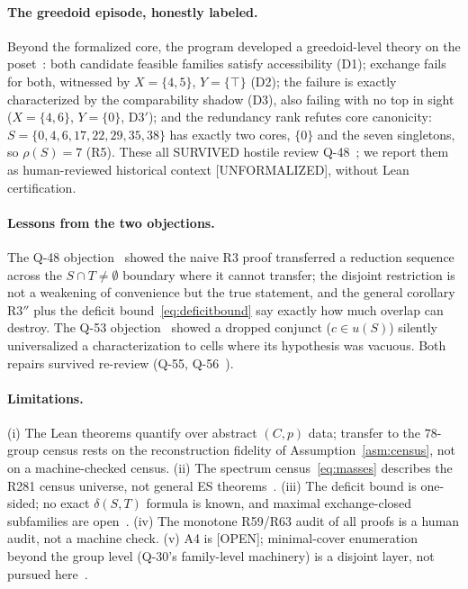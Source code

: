 \documentclass[11pt,a4paper]{article}
\theoremstyle{definition}
\begin{document}
\paragraph{The greedoid episode, honestly labeled.}  Beyond the formalized
core, the program developed a greedoid-level theory on the poset~\cite{D311}:
both candidate feasible families satisfy accessibility (D1); exchange fails
for both, witnessed by $X=\{4,5\}$, $Y=\{\top\}$ (D2); the failure is exactly
characterized by the comparability shadow (D3), also failing with no top in
sight ($X=\{4,6\}$, $Y=\{0\}$, D3$'$); and the redundancy rank refutes core
canonicity: $S=\{0,4,6,17,22,29,35,38\}$ has exactly two cores, $\{0\}$ and
the seven singletons, so $\rho(S)=7$ (R5).  These all SURVIVED hostile review
Q-48~\cite{D315}; we report them as human-reviewed historical context
[UNFORMALIZED], without Lean certification.

\paragraph{Lessons from the two objections.}  The Q-48 objection~\cite{D315}
showed the naive R3 proof transferred a reduction sequence across the
$S\cap T\ne\emptyset$ boundary where it cannot transfer; the disjoint
restriction is not a weakening of convenience but the true statement, and
the general corollary R3$''$ plus the deficit bound~\eqref{eq:deficitbound}
say exactly how much overlap can destroy.  The Q-53 objection~\cite{D316}
showed a dropped conjunct ($c\in u(S)$) silently universalized a
characterization to cells where its hypothesis was vacuous.  Both repairs
survived re-review (Q-55, Q-56~\cite{D322}).

\paragraph{Limitations.}  (i) The Lean theorems quantify over abstract
$(C,p)$ data; transfer to the $78$-group census rests on the reconstruction
fidelity of Assumption~\ref{asm:census}, not on a machine-checked census.
(ii) The spectrum census~\eqref{eq:masses} describes the R281 census
universe, not general ES theorems~\cite{D316}.  (iii) The deficit bound is
one-sided; no exact $\delta(S,T)$ formula is known, and maximal
exchange-closed subfamilies are open~\cite{D315,D311}.  (iv) The monotone
R59/R63 audit of all proofs is a human audit, not a machine check.
(v) A4 is [OPEN]; minimal-cover enumeration beyond the group level (Q-30's
family-level machinery) is a disjoint layer, not pursued here~\cite{D312}.
\end{document}
